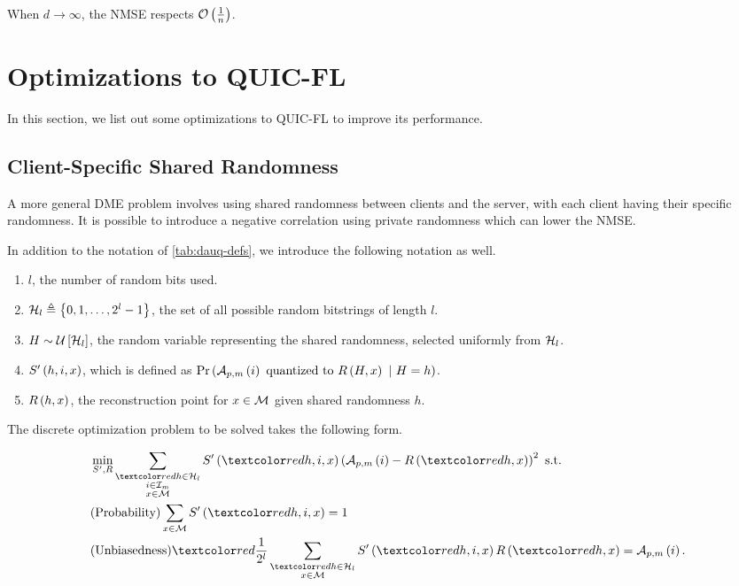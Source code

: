 \documentclass[journal,12pt,twocolumn]{IEEEtran}
\begin{document}
When \(d\to\infty\), the NMSE respects \(\mathcal O\left(\frac{1}{n}\right)\).

\section{Optimizations to QUIC-FL}
\label{sec:quicfl-opt}
In this section, we list out some optimizations to QUIC-FL to improve its
performance.
\subsection{Client-Specific Shared Randomness}
\label{ssec:quicfl-client-random}
A more general DME problem involves using shared randomness between clients and
the server, with each client having their specific randomness. It is possible to
introduce a negative correlation using private randomness which can lower the
NMSE.

In addition to the notation of \eqref{tab:dauq-defs}, we introduce the following
notation as well.

\begin{enumerate}
    \item \(l\), the number of random bits used.
    \item \(\mathcal H_l \triangleq \left\{0,1,\ldots,2^l-1\right\}\), the set of all
    possible random bitstrings of length \(l\).
    \item \(H \sim \mathcal U{}\left[\mathcal H_l\right]\), the random variable representing
    the shared randomness, selected uniformly from \(\mathcal H_l\).
    \item \(S^\prime\left(h,i,x\right)\), which is defined as \(\Pr\left(\mathcal A_{p,m}\left(i\right)
    \text{ quantized to } R\left(H, x\right)\ |\ H = h\right)\).
    \item \(R\left(h,x\right)\), the reconstruction point for \(x\in\mathcal M\)
    given shared randomness \(h\).
\end{enumerate}

The discrete optimization problem to be solved takes the following form.

\begin{align}
    &\min_{S^\prime,R} \sum_{\substack{\red{h\in\cH_l}\\i\in\cI_m\\x\in\cM}}S^\prime\brak{\red{h},i,x}\brak{\cA_{p,m}\brak{i} - R\brak{\red{h},x}}^2 \text{ s.t.} \label{eq:quicfl-rand-opt} \\
    &\text{(Probability)} \sum_{x\in\cM}S^\prime\brak{\red{h},i,x} = 1 \label{eq:quicfl-rand-prob} \\
    &\text{(Unbiasedness)} \red{\frac{1}{2^l}}\sum_{\substack{\red{h\in\cH_l}\\x\in\cM}}S^\prime\brak{\red{h},i,x}R\brak{\red{h},x} = \cA_{p,m}\brak{i}. \label{eq:quicfl-rand-unbias}
\end{align}
\end{document}
